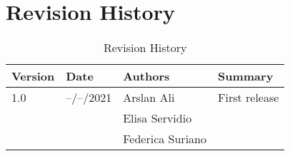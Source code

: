 \section{Revision History}

\renewcommand{\arraystretch}{1.5}
\begin{longtable}{|p{1.2cm}|p{1.6cm}|p{2.75cm}|p{2cm}|}
\caption{Revision History}\\
\hline
\endfirsthead
\endhead
\hline
\endlastfoot
\rowcolor{white!40!blue!70}
\textbf{Version} & \textbf{Date} & \textbf{Authors} & \textbf{Summary}\\
\hline
1.0 & --/--/2021 & Arslan Ali &  First release\\
& & Elisa Servidio & \\
& & Federica Suriano &\\
\hline
\end{longtable}